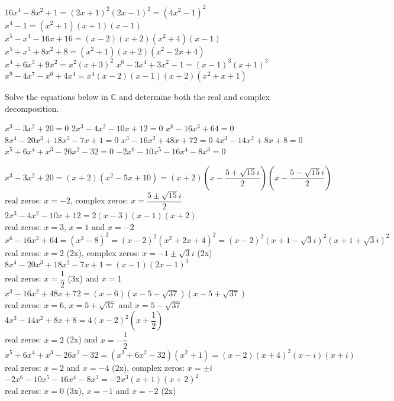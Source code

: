 \begin{Answer}\phantom{}
    
	\Question $16x^4 - 8x^2 + 1 = (2x + 1)^2(2x - 1)^2 = (4x^2 - 1)^2$
	\Question $x^4 - 1 = (x^2 + 1)(x + 1)(x - 1)$
	\Question $x^5 - x^4 - 16x + 16 = (x - 2)(x + 2)(x^2 + 4)(x - 1)$
	\Question $x^5 + x^3 + 8x^2 + 8 = (x^2+1)(x+2)(x^2-2x+4)$
	\Question $x^4+6x^3+9x^2 = x^2 (x+3)^2$
	\Question $x^6-3x^4+3x^2-1 = (x-1)^3(x+1)^3$
	\Question $x^9-4x^7-x^6+4x^4 = x^4 (x-2) (x-1) (x+2) (x^2+x+1)$
\end{Answer}
 
\begin{Exercise} Solve the equations below in $\mathbb{C}$ and determine both the real and complex decomposition.
 	\begin{multicols}{2}
     	\Question[difficulty = 1] $ x^3-3x^2+20=0$	
     	\Question[difficulty = 1] $ 2x^3-4x^2-10x+12=0$	
     	\ifanalysis\Question[difficulty = 1]\fi\ifcalculus\Question[difficulty = 2]\fi $ x^6-16x^3+64=0$	
     	\ifanalysis\Question[difficulty = 1]\fi\ifcalculus\Question[difficulty = 2]\fi $8x^4-20x^3+18x^2-7x+1=0$ 	
     	\Question[difficulty = 1] $ x^3-16x^2+48x+72=0$
     	\Question[difficulty = 1] $4x^3-14x^2+8x+8 =0$
     	\Question[difficulty = 1] $x^5 + 6x^4 + x^3 - 26 x^2 - 32=0 $ 
     	\Question[difficulty = 1] $-2x^6-10x^5-16x^4-8x^3 =0$
     	\EndCurrentQuestion
 	\end{multicols}
 
\end{Exercise}

\begin{Answer}\phantom{}
    
    \Question $ x^3-3x^2+20 = (x+2)(x^2-5x+10) = (x+2) \left( x- \dfrac{5+\sqrt{15}i}{2}\right) \left( x- \dfrac{5-\sqrt{15}i}{2}\right)$ \\
    real zeros: $x=-2$, complex zeros: $x=\dfrac{5 \pm \sqrt{15}i}{2}$
 	\Question $ 2x^3-4x^2-10x+12 = 2(x-3)(x-1)(x+2)$ \\
 	real zeros: $x=3$, $x=1$ and $x=-2$
 	\Question $x^6-16x^3+64 = (x^3-8)^2 = (x-2)^2(x^2+2x+4)^2 =(x-2)^2 \left(x+1 -\sqrt{3}i\right)^2\left(x+1 +\sqrt{3}i\right)^2$\\
 	real zeros: $x=2$ (2x),  complex zeros: $x=-1 \pm \sqrt{3}i$ (2x)
 	\Question $8x^4-20x^3+18x^2-7x+1 = (x-1)(2x-1)^3$\\
 	real zeros: $x = \dfrac{1}{2}$ (3x) and $x = 1$
 	\Question $x^3-16x^2+48x+72=(x-6)\left(x-5-\sqrt{37} \right)\left(x-5+\sqrt{37} \right)$	\\ 
 	real zeros: $x=6$, $x=5+\sqrt{37}$ and $x=5-\sqrt{37}$
 	\Question $4x^3-14x^2+8x+8 = 4(x-2)^2 \left(x+\dfrac{1}{2}\right)$ \\ 
 	real zeros: $x=2$ (2x) and $x=-\dfrac{1}{2}$
 	\Question $x^5 + 6x^4 + x^3 - 26 x^2 - 32= (x^3 + 6x^2 - 32)(x^2+1) = (x-2)(x+4)^2 (x-i)(x+i)$ \\ 
 	real zeros: $x=2$ and $x=-4$ (2x), complex zeros: $x=\pm i$
 	\Question $-2x^6-10x^5-16x^4-8x^3=-2x^3(x+1)(x+2)^2$ \\ 
 	real zeros: $x=0$ (3x), $x=-1$ and $x=-2$ (2x)
\end{Answer}
 	
